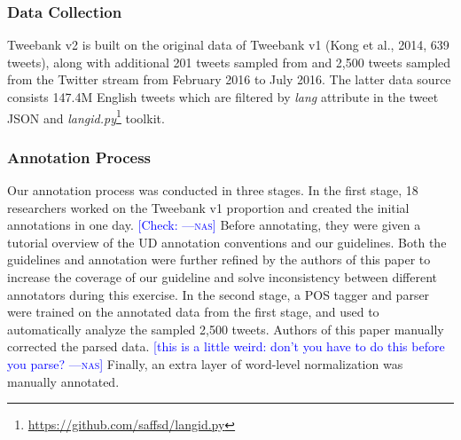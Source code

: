 \documentclass[11pt,a4paper]{article}
\newcommand{\nascomment}[1]{\textcolor{blue}{[#1 ---\textsc{nas}]}}
\begin{document}
\subsubsection{Data Collection}
{\sc Tweebank v2} is built on the original data of {\sc Tweebank v1} (Kong et al., 2014, 639 tweets), along with additional 201 tweets sampled from  and 2,500 tweets sampled  from the Twitter stream from February 2016 to July 2016.
The latter data source consists 147.4M English tweets which are filtered by {\it lang} attribute in the tweet JSON and {\it langid.py}\footnote{\url{https://github.com/saffsd/langid.py}} toolkit.

\subsubsection{Annotation Process}
Our annotation process was conducted in three stages.
In the first stage, 18 researchers worked on the {\sc Tweebank v1}
proportion and created the initial annotations in one day.
\nascomment{Check:} Before annotating, they were given a tutorial overview of the UD
annotation conventions and our guidelines.
Both the guidelines and annotation
were further refined by the authors of this paper to increase
the coverage of our guideline and solve inconsistency between
different annotators during this exercise. In the second stage, a POS tagger and
parser were trained on the annotated data from the first stage,
and used to automatically analyze the sampled 2,500 tweets.  Authors 
of this paper manually corrected the parsed data. \nascomment{this is
  a little weird:  don't you have to do this before you parse?} Finally, an extra
layer of word-level normalization was manually annotated.
\end{document}
